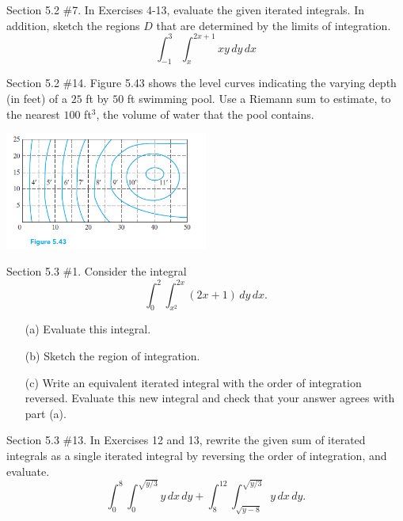 \documentclass[12pt,letterpaper]{hmcpset}
\begin{document}

\begin{problem}
Section 5.2 \#7. In Exercises 4-13, evaluate the given iterated integrals. In addition, sketch the regions $D$ that are determined by the limits of integration.
$$ \int_{-1}^{3} \int_{x}^{2x+1} x y \,dy \,dx $$
\end{problem}

\newpage

\begin{problem}
Section 5.2 \#14. Figure 5.43 shows the level curves indicating the varying depth (in feet) of a $25$ ft by $50$ ft swimming pool. Use a Riemann sum to estimate, to the nearest $100$ ft$^3$, the volume of water that the pool contains.
\begin{center}
\includegraphics[width=0.5\textwidth]{figure5-43.png}
\end{center}
\end{problem}

\newpage

\begin{problem}
Section 5.3 \#1. Consider the integral
$$ \int_{0}^{2} \int_{x^2}^{2x} (2x+1) \,dy \,dx .$$
\begin{enumerate}
	\item[(a)] Evaluate this integral.
	\item[(b)] Sketch the region of integration.
	\item[(c)] Write an equivalent iterated integral with the order of integration reversed. Evaluate this new integral and check that your answer agrees with part (a).
\end{enumerate}
\end{problem}

\newpage

\begin{problem}
Section 5.3 \#13. In Exercises 12 and 13, rewrite the given sum of iterated integrals as a single iterated integral by reversing the order of integration, and evaluate.
$$ \int_{0}^{8} \int_{0}^{\sqrt{y/3}} y \,dx \,dy + \int_{8}^{12} \int_{\sqrt{y-8}}^{\sqrt{y/3}} y \,dx \,dy.$$
\end{problem}
\end{document}
